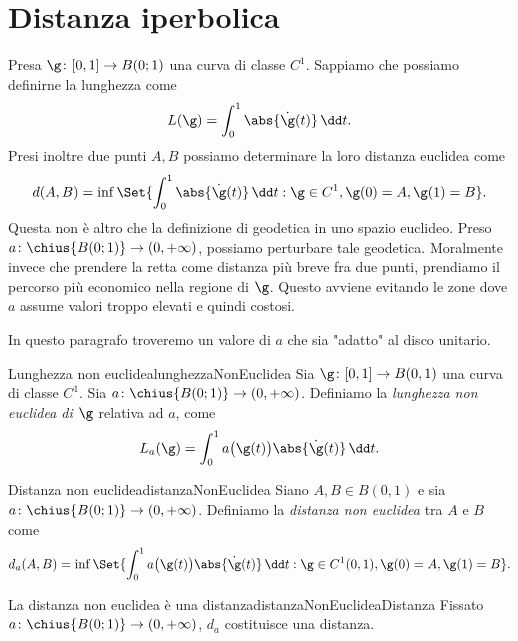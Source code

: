 \section{Distanza iperbolica}

Presa \(\g\colon [0,1] \to B(0;1)\) una curva di classe \(C^1\). Sappiamo che possiamo definirne la lunghezza come
\[
	L(\g) = \int_0^1 \abs{\dot{\g}(t)}\,\dd t.
\]
Presi inoltre due punti \(A,B\) possiamo determinare la loro distanza euclidea come
\[
	d(A,B) = \inf\Set{\int_0^1 \abs{\dot{\g}(t)}\,\dd t : \g\in C^1,\g(0)=A,\g(1)=B}.
\]
Questa non è altro che la definizione di geodetica in uno spazio euclideo.
Preso \(a\colon \chius{B(0;1)} \to (0,+\infty)\), possiamo perturbare tale geodetica. Moralmente invece che prendere la retta come distanza più breve fra due punti, prendiamo il percorso più economico nella regione di \(\g\). Questo avviene evitando le zone dove \(a\) assume valori troppo elevati e quindi costosi.

In questo paragrafo troveremo un valore di \(a\) che sia "adatto" al disco unitario.

\begin{defn}{Lunghezza non euclidea}{lunghezzaNonEuclidea}
	Sia \(\g\colon [0,1] \to B(0,1)\) una curva di classe \(C^1\). Sia \(a\colon \chius{B(0;1)} \to (0,+\infty)\). Definiamo la \emph{lunghezza non euclidea di \(\g\)} relativa ad \(a\), come
	\[
		L_a(\g) = \int_0^1 a\big(\g(t)\big)\abs{\dot{\g}(t)}\,\dd t.
	\]
\end{defn}

\begin{defn}{Distanza non euclidea}{distanzaNonEuclidea}
	Siano \(A,B\in B(0,1)\) e sia \(a\colon \chius{B(0;1)}\to (0,+\infty)\). Definiamo la \emph{distanza non euclidea} tra \(A\) e \(B\) come
	\[
		d_a(A,B) = \inf\Set{\int_0^1 a\big(\g(t)\big)\abs{\dot{\g}(t)}\,\dd t : \g\in C^1(0,1),\g(0)=A,\g(1)=B}.
	\]
\end{defn}

\begin{prop}{La distanza non euclidea è una distanza}{distanzaNonEuclideaDistanza}
	Fissato \(a\colon \chius{B(0;1)} \to (0,+\infty)\), \(d_a\) costituisce una distanza.
\end{prop}

